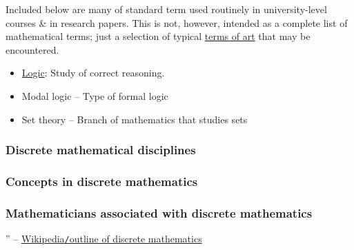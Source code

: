 \documentclass{article}
\begin{document}
Included below are many of standard term used routinely in university-level courses \& in research papers. This is not, however, intended as a complete list of mathematical terms; just a selection of typical \href{https://en.wikipedia.org/wiki/Term_of_art}{terms of art} that may be encountered.
\begin{itemize}
	\item \href{https://en.wikipedia.org/wiki/Logic}{Logic}: Study of correct reasoning.
	\item Modal logic – Type of formal logic
	\item Set theory – Branch of mathematics that studies sets
\end{itemize}

\subsubsection{Discrete mathematical disciplines}

\subsubsection{Concepts in discrete mathematics}

\subsubsection{Mathematicians associated with discrete mathematics}

'' -- \href{https://en.wikipedia.org/wiki/Outline_of_discrete_mathematics}{Wikipedia{\tt/}outline of discrete mathematics}


\printbibliography[heading=bibintoc]
	
\end{document}
